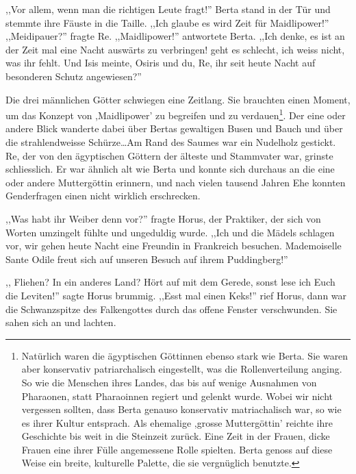 ,,Vor allem, wenn man die richtigen Leute fragt!'' Berta stand in der Tür und stemmte ihre Fäuste in die Taille. ,,Ich glaube es wird Zeit für Maidlipower!'' ,,Meidipauer?'' fragte Re. ,,Maidlipower!'' antwortete Berta. ,,Ich denke, es ist an der Zeit mal eine Nacht auswärts zu verbringen! \am geht es schlecht, ich weiss nicht, was ihr fehlt. Und Isis meinte, Osiris und du, Re, ihr seit heute Nacht auf besonderen Schutz angewiesen?''

Die drei männlichen Götter schwiegen eine Zeitlang. Sie brauchten einen Moment, um das Konzept von ,Maidlipower' zu begreifen und zu verdauen\footnote{Natürlich waren die ägyptischen Göttinnen ebenso stark wie Berta. Sie waren aber konservativ patriarchalisch eingestellt, was die Rollenverteilung anging. So wie die Menschen ihres Landes, das bis auf wenige Ausnahmen von Pharaonen, statt Pharaoinnen regiert und gelenkt wurde. Wobei wir nicht vergessen sollten, dass Berta genauso konservativ matriachalisch war, so wie es ihrer Kultur entsprach. Als ehemalige ,grosse Muttergöttin' reichte ihre Geschichte bis weit in die Steinzeit zurück. Eine Zeit in der Frauen, dicke Frauen eine ihrer Fülle angemessene Rolle spielten. Berta genoss auf diese Weise ein breite, kulturelle Palette, die sie vergnüglich benutzte.}. Der eine oder andere Blick wanderte dabei über Bertas gewaltigen Busen und Bauch und über die strahlendweisse Schürze\dots Am Rand des Saumes war ein Nudelholz gestickt. Re, der von den ägyptischen Göttern der älteste und Stammvater war, grinste schliesslich. Er war ähnlich alt wie Berta und konnte sich durchaus an die eine oder andere Muttergöttin erinnern, und nach vielen tausend Jahren Ehe konnten Genderfragen einen nicht wirklich erschrecken.

,,Was habt ihr Weiber denn vor?'' fragte Horus, der Praktiker, der sich von Worten umzingelt fühlte und ungeduldig wurde. ,,Ich und die Mädels schlagen vor, wir gehen heute Nacht eine Freundin in Frankreich besuchen. Mademoiselle Sante Odile freut sich auf unseren Besuch auf ihrem Puddingberg!'' 

,, Fliehen? In ein anderes Land? Hört auf mit dem Gerede, sonst lese ich Euch die Leviten!'' sagte Horus brummig. ,,Esst mal einen Keks!''  rief Horus, dann war die Schwanzspitze des Falkengottes durch das offene Fenster verschwunden. Sie sahen sich an und lachten.

